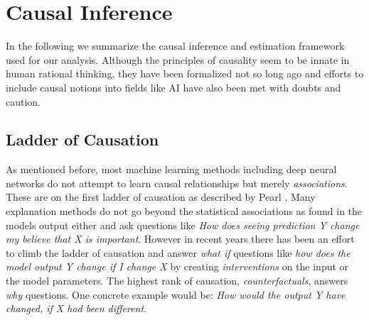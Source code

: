 \section{Causal Inference}
In the following we summarize the causal inference and estimation framework used for our analysis. 
Although the principles of causality seem to be innate in human rational thinking, they have been formalized not so long ago \cite{Spirtes1993, Halpern2005, Pearl2000} and efforts to include causal notions into fields like AI have also been met with doubts and caution. 

\subsection{Ladder of Causation}
As mentioned before, most machine learning methods including deep neural networks do not attempt to learn causal relationships but merely \textit{associations}. These are on the first ladder of causation as described by Pearl \cite{Pearl2000}. Many explanation methods do not go beyond the statistical associations as found in the models output either and ask questions like \textit{How does seeing prediction Y change my believe that X is important}. However in recent years there has been an effort to climb the ladder of causation and answer \textit{what if} questions like \textit{how does the model output Y change if I change X} by creating \textit{interventions} on the input or the model parameters. The highest rank of causation, \textit{counterfactuals}, answers \textit{why} questions. One concrete example would be: \textit{How would the output Y have changed, if X had been different}. 

